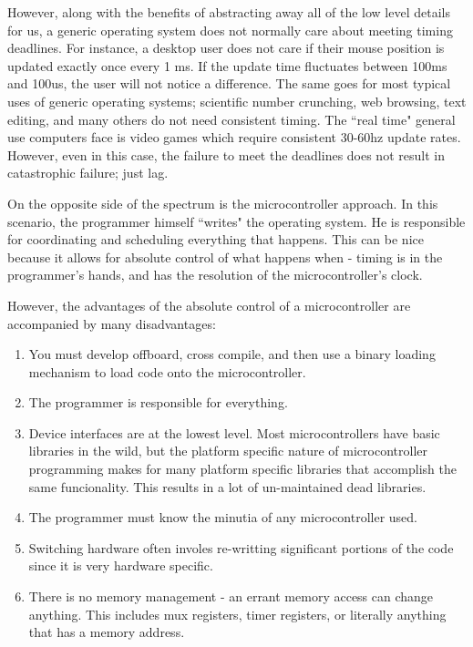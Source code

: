 \documentclass{article}
\begin{document}
However, along with the benefits of abstracting away all of the low level details for us, a generic operating system does not normally care about meeting timing deadlines.  For instance, a desktop user does not care if their mouse position is updated exactly once every 1 ms.  If the update time fluctuates between 100ms and 100us, the user will not notice a difference.  The same goes for most typical uses of generic operating systems; scientific number crunching, web browsing, text editing, and many others do not need consistent timing.  The ``real time" general use computers face is video games which require consistent 30-60hz update rates.  However, even in this case, the failure to meet the deadlines does not result in catastrophic failure; just lag.

On the opposite side of the spectrum is the microcontroller approach.  In this scenario, the programmer himself ``writes" the operating system.  He is responsible for coordinating and scheduling everything that happens.  This can be nice because it allows for absolute control of what happens when - timing is in the programmer's hands, and has the resolution of the microcontroller's clock.

However, the advantages of the absolute control of a microcontroller are accompanied by many disadvantages:
\begin{enumerate}
\item You must develop offboard, cross compile, and then use a binary loading mechanism to load code onto the microcontroller.
\item The programmer is responsible for everything.
\item Device interfaces are at the lowest level.  Most microcontrollers have basic libraries in the wild, but the platform specific nature of microcontroller programming makes for many platform specific libraries that accomplish the same funcionality.  This results in a lot of un-maintained dead libraries.
\item The programmer must know the minutia of any microcontroller used.
\item Switching hardware often involes re-writting significant portions of the code since it is very hardware specific.
\item There is no memory management - an errant memory access can change anything.  This includes mux registers, timer registers, or literally anything that has a memory address.
\end{enumerate}
\end{document}
